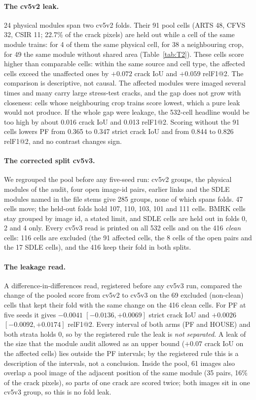 \paragraph{The cv5v2 leak.} 24 physical modules span two cv5v2 folds. Their 91 pool cells (ARTS 48, CFVS 32, CSIR 11; 22.7\% of
the crack pixels) are held out while a cell of the same module trains: for 4 of them the same physical cell, for 38 a neighbouring
crop, for 49 the same module without shared area (Table~\ref{tab:T2}). These cells score higher than comparable cells: within the
same source and cell type, the affected cells exceed the unaffected ones by $+0.072$ crack IoU and $+0.059$ relF1@2. The
comparison is descriptive, not causal. The affected modules were imaged several times and many carry large stress-test cracks, and
the gap does not grow with closeness: cells whose neighbouring crop trains score lowest, which a pure leak would not produce. If
the whole gap were leakage, the 532-cell headline would be too high by about 0.016 crack IoU and 0.013 relF1@2. Scoring without
the 91 cells lowers PF from 0.365 to 0.347 strict crack IoU and from 0.844 to 0.826 relF1@2, and no contrast changes sign.

\paragraph{The corrected split cv5v3.} We regrouped the pool before any five-seed run: cv5v2 groups, the physical modules of the
audit, four open image-id pairs, earlier links and the SDLE modules named in the file stems give 285 groups, none of which spans
folds. 47 cells move; the held-out folds hold 107, 110, 103, 101 and 111 cells. BMRK cells stay grouped by image id, a stated limit,
and SDLE cells are held out in folds 0, 2 and 4 only. Every cv5v3 read is printed on all 532 cells and on the 416 \emph{clean}
cells: 116 cells are excluded (the 91 affected cells, the 8 cells of the open pairs and the 17 SDLE cells), and the 416 keep their
fold in both splits.

\paragraph{The leakage read.} A difference-in-differences read, registered before any cv5v3 run, compared the change of the pooled
score from cv5v2 to cv5v3 on the 69 excluded (non-clean) cells that kept their fold with the same change on the 416 clean cells. For PF at five seeds it
gives $-0.0041$ $[-0.0136, +0.0069]$ strict crack IoU and $+0.0026$ $[-0.0092, +0.0174]$ relF1@2. Every interval of both arms (PF
and HOUSE) and both strata holds 0, so by the registered rule the leak is \emph{not separated}. A leak of the size that the module audit
allowed as an upper bound ($+0.07$ crack IoU on the affected cells) lies outside the PF intervals; by the registered rule this is
a description of the intervals, not a conclusion. Inside the pool, 61 images also overlap a pool image of the adjacent
position of the same module (35 pairs, 16\% of the crack pixels), so parts of one crack are scored twice; both images sit in one
cv5v3 group, so this is no fold leak.

